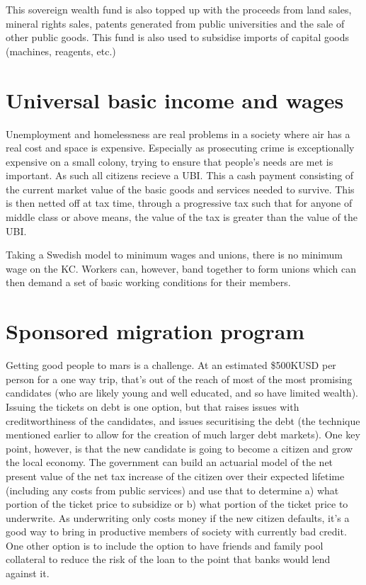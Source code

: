 \documentclass[10pt]{article}
\begin{document}
This sovereign wealth fund is also topped up with the proceeds from land sales, mineral rights sales, patents generated from public universities and the sale of other public goods. This fund is also used to subsidise imports of capital goods (machines, reagents, etc.)

\section{Universal basic income and wages}
Unemployment and homelessness are real problems in a society where air has a real cost and space is expensive. Especially as prosecuting crime is exceptionally expensive on a small colony, trying to ensure that people's needs are met is important. As such all citizens recieve a UBI. This a cash payment consisting of the current market value of the basic goods and services needed to survive. This is then netted off at tax time, through a progressive tax such that for anyone of middle class or above means, the value of the tax is greater than the value of the UBI. 

Taking a Swedish model to minimum wages and unions, there is no minimum wage on the KC. Workers can, however, band together to form unions which can then demand a set of basic working conditions for their members.

\section{Sponsored migration program}
Getting good people to mars is a challenge. At an estimated \$500KUSD per person for a one way trip, that's out of the reach of most of the most promising candidates (who are likely young and well educated, and so have limited wealth). Issuing the tickets on debt is one option, but that raises issues with creditworthiness of the candidates, and issues securitising the debt (the technique mentioned earlier to allow for the creation of much larger debt markets). One key point, however, is that the new candidate is going to become a citizen and grow the local economy. The government can build an actuarial model of the net present value of the net tax increase of the citizen over their expected lifetime (including any costs from public services) and use that to determine a) what portion of the ticket price to subsidize or b) what portion of the ticket price to underwrite. As underwriting only costs money if the new citizen defaults, it's a good way to bring in productive members of society with currently bad credit. One other option is to include the option to have friends and family pool collateral to reduce the risk of the loan to the point that banks would lend against it.
\end{document}
